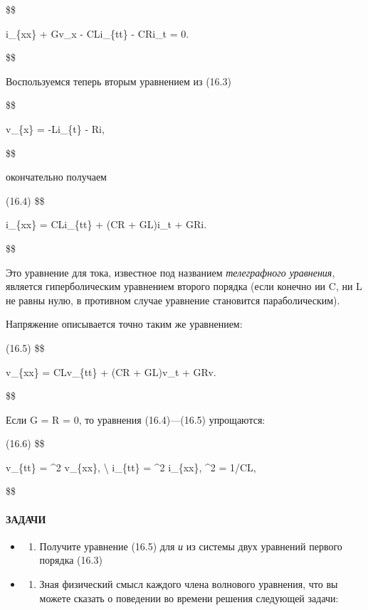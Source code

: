 \$\$

i\_\{xx\} + Gv\_x - CLi\_\{tt\} - CRi\_t = 0.

\$\$

Воспользуемся теперь вторым уравнением из (16.3)

\$\$

v\_\{x\} = -Li\_\{t\} - Ri,

\$\$

окончательно получаем

(16.4) \$\$

i\_\{xx\} = CLi\_\{tt\} + (CR + GL)i\_t + GRi.

\$\$

Это уравнение для тока, известное под названием \emph{телеграфного уравнения}, является гиперболическим уравнением второго порядка (если конечно ии C, ни L не равны нулю, в противном случае уравнение становится параболическим).

Напряжение описывается точно таким же уравнением:

(16.5) \$\$

v\_\{xx\} = CLv\_\{tt\} + (CR + GL)v\_t + GRv.

\$\$

Если G = R = 0, то уравнения (16.4)---(16.5) упрощаются:

(16.6) \$\$

v\_\{tt\} = \alpha\^{}2 v\_\{xx\}, \textbackslash{} i\_\{tt\} = \alpha\^{}2 i\_\{xx\}, \qquad \alpha\^{}2 = 1/CL,

\$\$

\paragraph{ЗАДАЧИ}\label{ux437ux430ux434ux430ux447ux438-1}

\begin{itemize}
\tightlist
\item
  \begin{enumerate}
  \def\labelenumi{\arabic{enumi}.}
  \tightlist
  \item
    Получите уравнение (16.5) для \emph{и} из системы двух уравнений первого порядка (16.3)
  \end{enumerate}
\item
  \begin{enumerate}
  \def\labelenumi{\arabic{enumi}.}
  \setcounter{enumi}{1}
  \tightlist
  \item
    Зная физический смысл каждого члена волнового уравнения, что вы можете сказать о поведении во времени решения следующей задачи:
  \end{enumerate}
\end{itemize}


